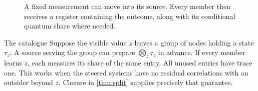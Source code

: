 \begin{figure}[H]
\centering
{}
\caption{A fixed measurement can move into its source. Every member then receives a register containing the outcome, along with its conditional quantum share where needed.}
\label{fig:premeasure}
\end{figure}

\begin{ideabox}{The catalogue}
Suppose the visible value $z$ leaves a group of nodes holding a state $\tau_z$. A source serving the group
can prepare $\bigotimes_z\tau_z$ in advance. If every member learns $z$, each measures its share of the
same entry. All unused entries have trace one. This works when the steered systems have no residual
correlations with an outsider beyond $z$. Closure in \cref{thm:split} supplies precisely that guarantee.
\end{ideabox}

